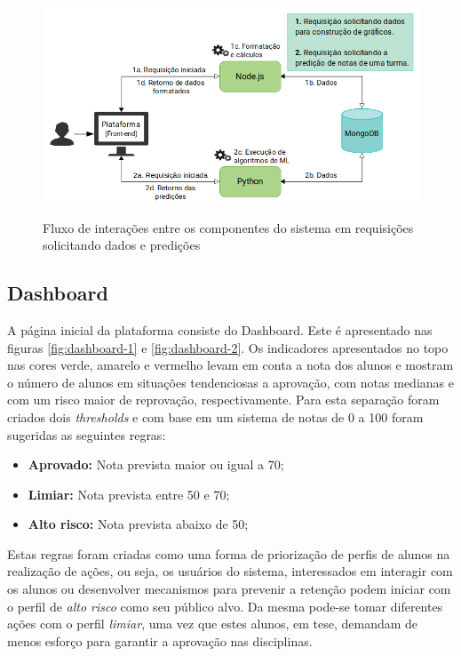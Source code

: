 \begin{figure}[!htb]
    \centering
    \caption{Fluxo de interações entre os componentes do sistema em requisições solicitando dados e predições}
    \includegraphics[height=0.45\textwidth]{./dados/figuras/diagrama2}
    \label{fig:diagrama-2}
\end{figure}

\subsection{Dashboard}
\label{ssec:dashboard}

A página inicial da plataforma consiste do Dashboard. 
Este é apresentado nas figuras \ref{fig:dashboard-1} e \ref{fig:dashboard-2}.
Os indicadores apresentados no topo nas cores verde, amarelo e vermelho levam em conta a nota dos alunos e mostram o número de alunos em situações tendenciosas a aprovação, com notas medianas e com um risco maior de reprovação, respectivamente.
Para esta separação foram criados dois \textit{thresholds} e com base em um sistema de notas de 0 a 100 foram sugeridas as seguintes regras:
\begin{itemize}[topsep=5pt]
    \item \textbf{Aprovado:} Nota prevista maior ou igual a 70;
    \item \textbf{Limiar:} Nota prevista entre 50 e 70;
    \item \textbf{Alto risco:} Nota prevista abaixo de 50;
\end{itemize}

Estas regras foram criadas como uma forma de priorização de perfis de alunos na realização de ações, ou seja, os usuários do sistema, interessados em interagir com os alunos ou desenvolver mecanismos para prevenir a retenção podem iniciar com o perfil de \textit{alto risco} como seu público alvo. 
Da mesma pode-se tomar diferentes ações com o perfil \textit{limiar}, uma vez que estes alunos, em tese, demandam de menos esforço para garantir a aprovação nas disciplinas.

